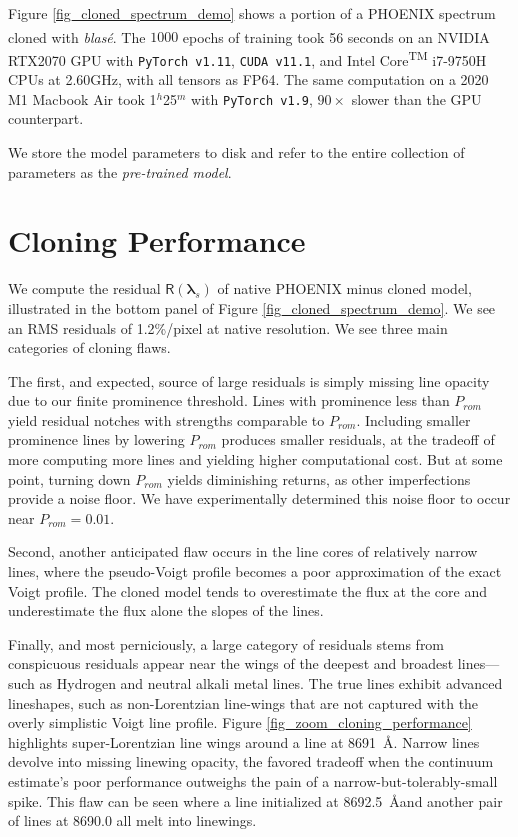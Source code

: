 \documentclass[modern]{aastex631}
\begin{document}
Figure \ref{fig_cloned_spectrum_demo} shows a portion of a PHOENIX spectrum cloned with \emph{blas\'e}. The $1000$ epochs of training took 56 seconds on an NVIDIA\textsuperscript{\tiny\textregistered} RTX2070 GPU with \texttt{PyTorch v1.11}, \texttt{CUDA v11.1}, and Intel\textsuperscript{\tiny\textregistered} Core\textsuperscript{\tiny TM} i7-9750H CPUs at 2.60GHz, with all tensors as FP64. The same computation on a 2020 M1 Macbook Air took 1$^h$25$^m$ with \texttt{PyTorch v1.9}, $90\times$ slower than the GPU counterpart.

We store the model parameters to disk and refer to the entire collection of parameters as the \emph{pre-trained model}.

\section{Cloning Performance}

We compute the residual $\mathsf{R}(\bm{\lambda}_s)$ of native PHOENIX minus cloned model, illustrated in the bottom panel of Figure \ref{fig_cloned_spectrum_demo}. We see an RMS residuals of 1.2\%/pixel at native resolution. We see three main categories of cloning flaws.

The first, and expected, source of large residuals is simply missing line opacity due to our finite prominence threshold. Lines with prominence less than $P_{rom}$ yield residual notches with strengths comparable to $P_{rom}$. Including smaller prominence lines by lowering $P_{rom}$ produces smaller residuals, at the tradeoff of more computing more lines and yielding higher computational cost.  But at some point, turning down $P_{rom}$ yields diminishing returns, as other imperfections provide a noise floor.  We have experimentally determined this noise floor to occur near $P_{rom}=0.01$.

Second, another anticipated flaw occurs in the line cores of relatively narrow lines, where the pseudo-Voigt profile becomes a poor approximation of the exact Voigt profile.  The cloned model tends to overestimate the flux at the core and underestimate the flux alone the slopes of the lines.

Finally, and most perniciously, a large category of residuals stems from conspicuous residuals appear near the wings of the deepest and broadest lines---such as Hydrogen and neutral alkali metal lines.  The true lines exhibit advanced lineshapes, such as non-Lorentzian line-wings that are not captured with the overly simplistic Voigt line profile.  Figure \ref{fig_zoom_cloning_performance} highlights super-Lorentzian line wings around a line at 8691~\AA.  Narrow lines devolve into missing linewing opacity, the favored tradeoff when the continuum estimate's poor performance outweighs the pain of a narrow-but-tolerably-small spike. This flaw can be seen  where a line initialized at 8692.5~\AA and another pair of lines at 8690.0 all melt into linewings.
\end{document}
